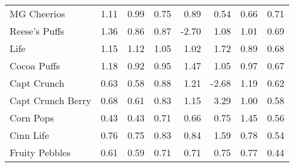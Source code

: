 \documentclass[aspectratio=169,10pt]{beamer}
\begin{document}
\begin{frame}[plain]
\begin{center}
{\begin{tabular}{lrrrrrrr}
MG Cheerios         &      1.11 &       0.99 &         0.75 &           0.89 &         0.54 &         0.66 &    0.71 \\
Reese's Puffs       &      1.36 &       0.86 &         0.87 &          -2.70 &         1.08 &         1.01 &    0.69 \\
Life                &      1.15 &       1.12 &         1.05 &           1.02 &         1.72 &         0.89 &    0.68 \\
Cocoa Puffs         &      1.18 &       0.92 &         0.95 &           1.47 &         1.05 &         0.97 &    0.67 \\
Capt Crunch         &      0.63 &       0.58 &         0.88 &           1.21 &        -2.68 &         1.19 &    0.62 \\
Capt Crunch Berry   &      0.68 &       0.61 &         0.83 &           1.15 &         3.29 &         1.00 &    0.58 \\
Corn Pops           &      0.43 &       0.43 &         0.71 &           0.66 &         0.75 &         1.45 &    0.56 \\
Cinn Life           &      0.76 &       0.75 &         0.83 &           0.84 &         1.59 &         0.78 &    0.54 \\
Fruity Pebbles      &      0.61 &       0.59 &         0.71 &           0.71 &         0.75 &         0.77 &    0.44 \\
\bottomrule
\end{tabular}

}
\end{center}
\end{frame}





\end{document}
